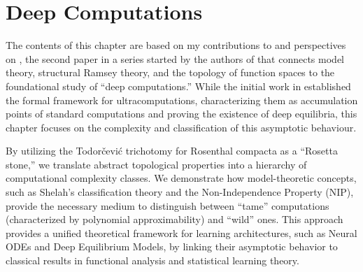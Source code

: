 
\chapter{Deep Computations}\label{ch:deep_computations}

The contents of this chapter are based on my contributions to and perspectives on \cite{Duenezetal2026}, the second paper in a series started by the authors of \cite{alva2024approximability} that connects model theory, structural Ramsey theory, and the topology of function spaces to the foundational study of ``deep computations.''
While the initial work in \cite{alva2024approximability} established the formal framework for ultracomputations, characterizing them as accumulation points of standard computations and proving the existence of deep equilibria, this chapter focuses on the complexity and classification of this asymptotic behaviour.

By utilizing the Todorčević trichotomy for Rosenthal compacta as a ``Rosetta stone,'' we translate abstract topological properties into a hierarchy of computational complexity classes.
We demonstrate how model-theoretic concepts, such as Shelah's classification theory and the Non-Independence Property (NIP), provide the necessary medium to distinguish between ``tame'' computations (characterized by polynomial approximability) and ``wild'' ones.
This approach provides a unified theoretical framework for learning architectures, such as Neural ODEs and Deep Equilibrium Models, by linking their asymptotic behavior to classical results in functional analysis and statistical learning theory.





